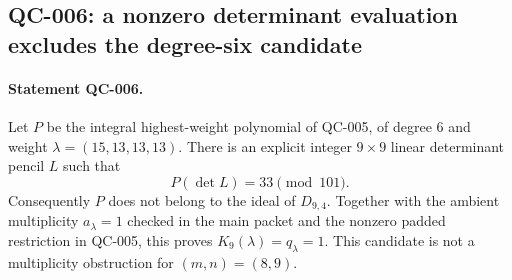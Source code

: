 \subsection{QC-006: a nonzero determinant evaluation excludes the degree-six candidate}

\paragraph{Statement QC-006.}
Let $P$ be the integral highest-weight polynomial of QC-005, of
degree $6$ and weight $\lambda=(15,13,13,13)$. There is an explicit
integer $9\times9$ linear determinant pencil $L$ such that
\[
 P(\det L)=33\pmod {101}.
 \tag{QC-006.1}
\]
Consequently $P$ does not belong to the ideal of $D_{9,4}$.
Together with the ambient multiplicity $a_\lambda=1$ checked in
the main packet and the nonzero padded restriction in QC-005,
this proves $K_9(\lambda)=q_\lambda=1$. This candidate is not
a multiplicity obstruction for $(m,n)=(8,9)$.


